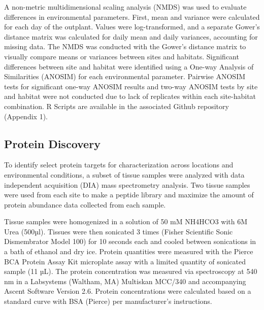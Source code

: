 \documentclass [11pt, proquest] {uwthesis}[2015/03/03]
\begin{document}
A non-metric multidimensional scaling analysis (NMDS) was used to evaluate differences in environmental parameters. First, mean and variance were calculated for each day of the outplant. Values were log-transformed, and a separate Gower's distance matrix was calculated for daily mean and daily variances, accounting for missing data. The NMDS was conducted with the Gower's distance matrix to visually compare means or variances between sites and habitats. Significant differences between site and habitat were identified using a One-way Analysis of Similarities (ANOSIM) for each environmental parameter. Pairwise ANOSIM tests for significant one-way ANOSIM results and two-way ANOSIM tests by site and habitat were not conducted due to lack of replicates within each site-habitat combination. R Scripts are available in the associated Github repository (Appendix 1).

\hypertarget{protein-discovery}{%
\subsection{Protein Discovery}\label{protein-discovery}}

To identify select protein targets for characterization across locations and environmental conditions, a subset of tissue samples were analyzed with data independent acquisition (DIA) mass spectrometry analysis. Two tissue samples were used from each site to make a peptide library and maximize the amount of protein abundance data collected from each sample.

Tissue samples were homogenized in a solution of 50 mM NH4HCO3 with 6M Urea (500µl). Tissues were then sonicated 3 times (Fisher Scientific Sonic Dismembrator Model 100) for 10 seconds each and cooled between sonications in a bath of ethanol and dry ice. Protein quantities were measured with the Pierce BCA Protein Assay Kit microplate assay with a limited quantity of sonicated sample (11 µL). The protein concentration was measured via spectroscopy at 540 nm in a Labsystems (Waltham, MA) Multiskan MCC/340 and accompanying Ascent Software Version 2.6. Protein concentrations were calculated based on a standard curve with BSA (Pierce) per manufacturer's instructions.
\end{document}
